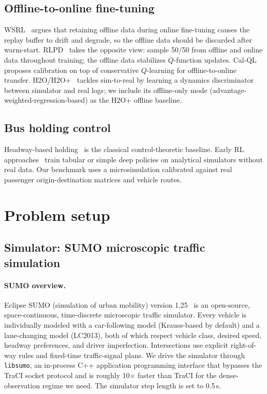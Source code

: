 \documentclass[journal,10pt]{IEEEtran}
\begin{document}
\subsection{Offline-to-online fine-tuning}
WSRL~\cite{zhou2024efficient} argues that retaining offline data during online fine-tuning causes the replay buffer to drift and degrade, so the offline data should be discarded after warm-start. RLPD~\cite{ball2023efficient} takes the opposite view: sample 50/50 from offline and online data throughout training; the offline data stabilizes $Q$-function updates. Cal-QL~\cite{nakamoto2023calql} proposes calibration on top of conservative $Q$-learning for offline-to-online transfer. H2O/H2O+~\cite{niu2022trust} tackles sim-to-real by learning a dynamics discriminator between simulator and real logs; we include its offline-only mode (advantage-weighted-regression-based) as the H2O+ offline baseline.

\subsection{Bus holding control}
Headway-based holding~\cite{daganzo2009headway,bartholdi2012self} is the classical control-theoretic baseline. Early RL approaches~\cite{alesiani2018reinforcement,wang2020holding} train tabular or simple deep policies on analytical simulators without real data. Our benchmark uses a microsimulation calibrated against real passenger origin-destination matrices and vehicle routes.

\section{Problem setup}
\label{sec:setup}

\subsection{Simulator: SUMO microscopic traffic simulation}
\label{sec:sumo}

\paragraph{SUMO overview.} Eclipse SUMO (simulation of urban mobility) version 1.25~\cite{lopez2018microscopic} is an open-source, space-continuous, time-discrete microscopic traffic simulator. Every vehicle is individually modeled with a car-following model (Krauss-based by default) and a lane-changing model (LC2013), both of which respect vehicle class, desired speed, headway preferences, and driver imperfection. Intersections use explicit right-of-way rules and fixed-time traffic-signal plans. We drive the simulator through \texttt{libsumo}, an in-process C++ application programming interface that bypasses the TraCI socket protocol and is roughly 10$\times$ faster than TraCI for the dense-observation regime we need. The simulator step length is set to 0.5\,s.
\end{document}
